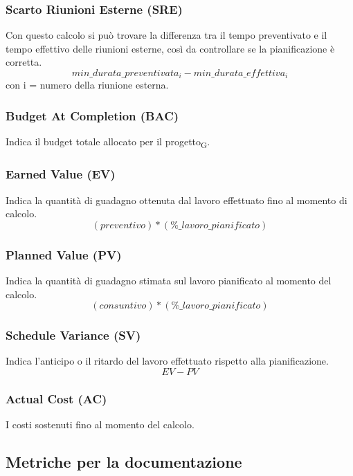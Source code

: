\subsubsection{Scarto Riunioni Esterne (SRE)}
Con questo calcolo si può trovare la differenza tra il tempo preventivato e il tempo effettivo delle riunioni esterne, così da controllare se la pianificazione è corretta.
\[min\_durata\_preventivata_i-min\_durata\_effettiva_i\]
con i = numero della riunione esterna.
\subsubsection{Budget At Completion (BAC)}
Indica il budget totale allocato per il progetto\textsubscript{G}.

\subsubsection{Earned Value (EV)}
Indica la quantità di guadagno ottenuta dal lavoro effettuato fino al momento di calcolo.
\[
    (preventivo)*(\%\_lavoro\_pianificato)
\]

\subsubsection{Planned Value (PV)}
Indica la quantità di guadagno stimata sul lavoro pianificato al momento del calcolo.
\[
    (consuntivo)*(\%\_lavoro\_pianificato)
\]

\subsubsection{Schedule Variance (SV)}
Indica l'anticipo o il ritardo del lavoro effettuato rispetto alla pianificazione.
\[
    EV - PV
\]

\subsubsection{Actual Cost (AC)}
I costi sostenuti fino al momento del calcolo.


\subsection{Metriche per la documentazione}

